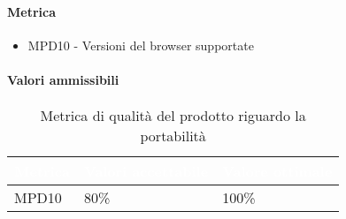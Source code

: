 \paragraph{Metrica}
\begin{itemize}
\item MPD10 - Versioni del browser supportate
\end{itemize}
\paragraph{Valori ammissibili}
\renewcommand{\arraystretch}{1.5}
\begin{longtable}{C{2.5cm} C{4cm} C{4cm}}
\textcolor{white}{\textbf{Metrica}}&
\textcolor{white}{\textbf{Valori accettabile}}&
\textcolor{white}{\textbf{Valore ottimale}}\\	
\endhead
\endfoot
{}\caption{Metrica di qualità del prodotto riguardo la portabilità}
\endlastfoot
		MPD10 &  
		80\% &
		100\% \\
\end{longtable}